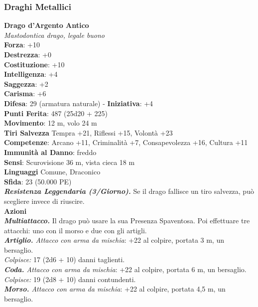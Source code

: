 \begin{multicols}{2}
\subsubsection{Draghi Metallici}

\medskip\textbf{Drago d'Argento Antico}\\
\emph{Mastodontica drago, legale buono}\\
\textbf{Forza}: +10\\
\textbf{Destrezza}: +0\\
\textbf{Costituzione}: +10\\
\textbf{Intelligenza}: +4\\
\textbf{Saggezza}: +2\\
\textbf{Carisma}: +6\\
\textbf{Difesa}: 29 (armatura naturale) - \textbf{Iniziativa}: +4\\
\textbf{Punti Ferita}: 487 (25d20 + 225) \\
\textbf{Movimento}: 12 m, volo 24 m\\
\textbf{Tiri Salvezza} Tempra +21, Riflessi +15, Volontà +23\\
\textbf{Competenze}: Arcano +11, Criminalità +7, Consapevolezza +16, Cultura +11\\
\textbf{Immunità al Danno}: freddo\\
\textbf{Sensi}: Scurovisione 36 m, vista cieca 18 m\\
\textbf{Linguaggi} Comune, Draconico\\
\textbf{Sfida}: 23 (50.000 PE)\smallskip\\
\emph{\textbf{Resistenza Leggendaria (3/Giorno).}} Se il drago fallisce un tiro salvezza, può scegliere invece di riuscire.\\
\smallskip\textbf{Azioni} \\
\emph{\textbf{Multiattacco.}} Il drago può usare la sua Presenza Spaventosa. Poi effettuare tre attacchi: uno con il morso e due con gli artigli.\\
\emph{\textbf{Artiglio.} Attacco con arma da mischia}: +22 al colpire, portata 3 m, un bersaglio.\\
\emph{Colpisce:} 17 (2d6 + 10) danni taglienti.\\
\emph{\textbf{Coda.} Attacco con arma da mischia}: +22 al colpire, portata 6 m, un bersaglio.\\
\emph{Colpisce:} 19 (2d8 + 10) danni contundenti. \\
\emph{\textbf{Morso.} Attacco con arma da mischia}: +22 al colpire, portata 4,5 m, un bersaglio.\\

\end{multicols}
